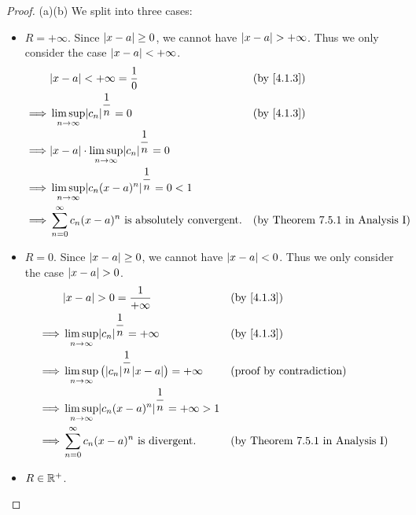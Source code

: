 \begin{proof}{(a)}{(b)}
  We split into three cases:
  \begin{itemize}
    \item \(R = +\infty\).
          Since \(\left\lvert x - a\right\rvert \geq 0\), we cannot have \(\left\lvert x - a\right\rvert > +\infty\).
          Thus we only consider the case \(\left\lvert x - a\right\rvert < +\infty\).
          \begin{align*}
                     & \abs{x - a} < +\infty = \dfrac{1}{0}                                  &  & \text{(by \cref{4.1.3})}                \\
            \implies & \limsup_{n \to \infty} \abs{c_n}^{\dfrac{1}{n}} = 0                   &  & \text{(by \cref{4.1.3})}                \\
            \implies & \abs{x - a} \cdot \limsup_{n \to \infty} \abs{c_n}^{\dfrac{1}{n}} = 0                                              \\
            \implies & \limsup_{n \to \infty} \abs{c_n (x - a)^n}^{\dfrac{1}{n}} = 0 < 1                                                  \\
            \implies & \sum_{n = 0}^\infty c_n (x - a)^n \text{ is absolutely convergent}.   &  & \text{(by Theorem 7.5.1 in Analysis I)}
          \end{align*}
    \item \(R = 0\).
          Since \(\left\lvert x - a\right\rvert \geq 0\), we cannot have \(\left\lvert x - a\right\rvert < 0\).
          Thus we only consider the case \(\left\lvert x - a\right\rvert > 0\).
          \begin{align*}
                     & \abs{x - a} > 0 = \dfrac{1}{+\infty}                                            &  & \text{(by \cref{4.1.3})}                \\
            \implies & \limsup_{n \to \infty} \abs{c_n}^{\dfrac{1}{n}} = +\infty                       &  & \text{(by \cref{4.1.3})}                \\
            \implies & \limsup_{n \to \infty} \big(\abs{c_n}^{\dfrac{1}{n}} \abs{x - a}\big) = +\infty &  & \text{(proof by contradiction)}         \\
            \implies & \limsup_{n \to \infty} \abs{c_n (x - a)^n}^{\dfrac{1}{n}} = +\infty > 1                                                      \\
            \implies & \sum_{n = 0}^\infty c_n (x - a)^n \text{ is divergent}.                         &  & \text{(by Theorem 7.5.1 in Analysis I)}
          \end{align*}
    \item \(R \in \mathbb{R}^+\).

\end{itemize}
\end{proof}
